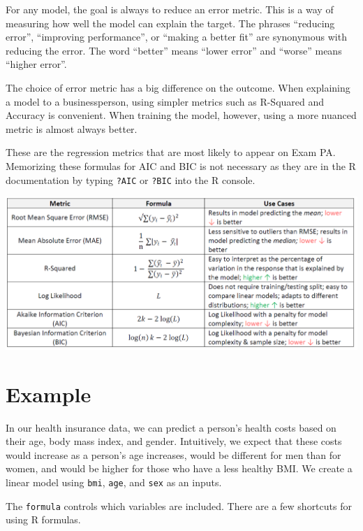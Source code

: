 \documentclass[openany]{book}
\begin{document}
For any model, the goal is always to reduce an error metric. This is a way of measuring how well the model can explain the target. The phrases ``reducing error'', ``improving performance'', or ``making a better fit'' are synonymous with reducing the error. The word ``better'' means ``lower error'' and ``worse'' means ``higher error''.

The choice of error metric has a big difference on the outcome. When explaining a model to a businessperson, using simpler metrics such as R-Squared and Accuracy is convenient. When training the model, however, using a more nuanced metric is almost always better.

These are the regression metrics that are most likely to appear on Exam PA. Memorizing these formulas for AIC and BIC is not necessary as they are in the R documentation by typing \texttt{?AIC} or \texttt{?BIC} into the R console.

\begin{center}\includegraphics[width=13\linewidth]{images/regression_metrics} \end{center}

\hypertarget{example}{%
\section{Example}\label{example}}

In our health insurance data, we can predict a person's health costs based on their age, body mass index, and gender. Intuitively, we expect that these costs would increase as a person's age increases, would be different for men than for women, and would be higher for those who have a less healthy BMI. We create a linear model using \texttt{bmi}, \texttt{age}, and \texttt{sex} as an inputs.

The \texttt{formula} controls which variables are included. There are a few shortcuts for using R formulas.
\end{document}
